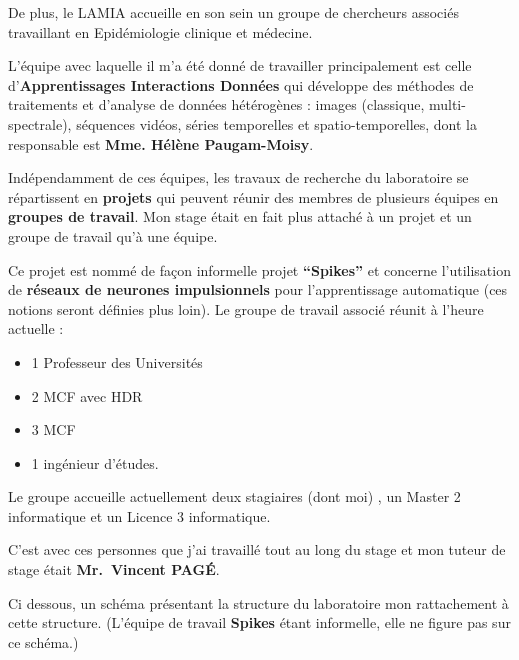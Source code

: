 De plus, le LAMIA accueille en son sein un groupe de chercheurs associés
travaillant en Epidémiologie clinique et médecine.

L'équipe avec laquelle il m'a été donné de travailler principalement est
celle d'\textbf{Apprentissages Interactions Données} qui développe des
méthodes de traitements et d'analyse de données hétérogènes : images
(classique, multi-spectrale), séquences vidéos, séries temporelles et
spatio-temporelles, dont la responsable est \textbf{Mme. Hélène
Paugam-Moisy}.

Indépendamment de ces équipes, les travaux de recherche du laboratoire
se répartissent en \textbf{projets} qui peuvent réunir des membres de
plusieurs équipes en \textbf{groupes de travail}. Mon stage était en
fait plus attaché à un projet et un groupe de travail qu'à une équipe.

Ce projet est nommé de façon informelle projet \textbf{``Spikes''} et
concerne l'utilisation de \textbf{réseaux de neurones impulsionnels}
pour l'apprentissage automatique (ces notions seront définies plus
loin). Le groupe de travail associé réunit à l'heure actuelle :

\begin{itemize}
\tightlist
\item
  1 Professeur des Universités
\item
  2 MCF avec HDR
\item
  3 MCF
\item
  1 ingénieur d'études.
\end{itemize}

Le groupe accueille actuellement deux stagiaires (dont moi) , un Master
2 informatique et un Licence 3 informatique.

C'est avec ces personnes que j'ai travaillé tout au long du stage et mon
tuteur de stage était \textbf{Mr.~Vincent PAGÉ}.

Ci dessous, un schéma présentant la structure du laboratoire mon
rattachement à cette structure. (L'équipe de travail \textbf{Spikes}
étant informelle, elle ne figure pas sur ce schéma.)

